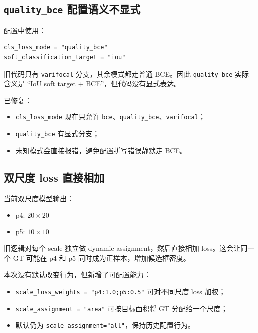 \documentclass[UTF8]{ctexart}
\begin{document}
\subsection{\texttt{quality\_bce} 配置语义不显式}

配置中使用：

\begin{verbatim}
cls_loss_mode = "quality_bce"
soft_classification_target = "iou"
\end{verbatim}

旧代码只有 \texttt{varifocal} 分支，其余模式都走普通 BCE。因此 \texttt{quality\_bce} 实际含义是 ``IoU soft target + BCE''，但代码没有显式表达。

已修复：

\begin{itemize}[leftmargin=2em]
  \item \texttt{cls\_loss\_mode} 现在只允许 \texttt{bce}、\texttt{quality\_bce}、\texttt{varifocal}；
  \item \texttt{quality\_bce} 有显式分支；
  \item 未知模式会直接报错，避免配置拼写错误静默走 BCE。
\end{itemize}

\subsection{双尺度 loss 直接相加}

当前双尺度模型输出：

\begin{itemize}[leftmargin=2em]
  \item p4: $20\times20$
  \item p5: $10\times10$
\end{itemize}

旧逻辑对每个 scale 独立做 dynamic assignment，然后直接相加 loss。这会让同一个 GT 可能在 p4 和 p5 同时成为正样本，增加候选框密度。

本次没有默认改变行为，但新增了可配置能力：

\begin{itemize}[leftmargin=2em]
  \item \texttt{scale\_loss\_weights = "p4:1.0;p5:0.5"} 可对不同尺度 loss 加权；
  \item \texttt{scale\_assignment = "area"} 可按目标面积将 GT 分配给一个尺度；
  \item 默认仍为 \texttt{scale\_assignment="all"}，保持历史配置行为。
\end{itemize}
\end{document}
